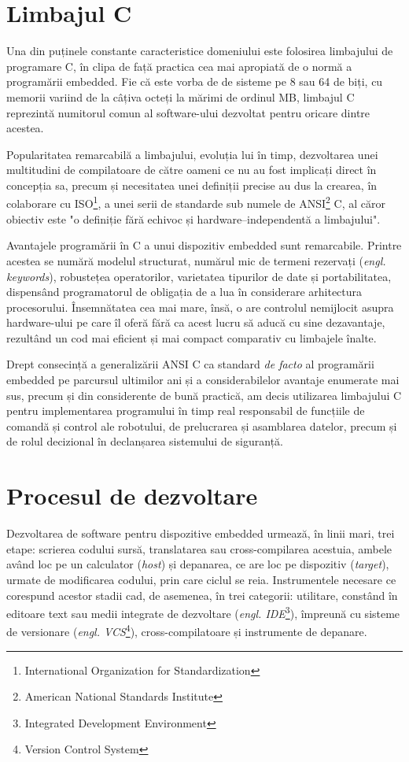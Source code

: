 \section{Limbajul C}

Una din puținele constante caracteristice domeniului este folosirea limbajului de programare C, în clipa de față practica cea mai apropiată de o normă a programării embedded. Fie că este vorba de de sisteme pe 8 sau 64 de biți, cu memorii variind de la câțiva octeți la mărimi de ordinul MB, limbajul C reprezintă numitorul comun al software-ului dezvoltat pentru oricare dintre acestea. \cite{barr}

Popularitatea remarcabilă a limbajului, evoluția lui în timp, dezvoltarea unei multitudini de compilatoare de către oameni ce nu au fost implicați direct în concepția sa, precum și necesitatea unei definiții precise au dus la crearea, în colaborare cu ISO\footnote{International Organization for Standardization}, a unei serii de standarde sub numele de ANSI\footnote{American National Standards Institute} C, al căror obiectiv este "o definiție fără echivoc și hardware--independentă a limbajului". \cite{ritchie}

Avantajele programării în C a unui dispozitiv embedded sunt remarcabile. Printre acestea se numără modelul structurat, numărul mic de termeni rezervați (\textit{engl. keywords}), robustețea operatorilor, varietatea tipurilor de date și portabilitatea, dispensând programatorul de obligația de a lua în considerare arhitectura procesorului. Însemnătatea cea mai mare, însă, o are controlul nemijlocit asupra hardware-ului pe care îl oferă fără ca acest lucru să aducă cu sine dezavantaje, rezultând un cod mai eficient și mai compact comparativ cu limbajele înalte.

Drept consecință a generalizării ANSI C ca standard \textit{de facto} al programării embedded pe parcursul ultimilor ani și a considerabilelor avantaje enumerate mai sus, precum și din considerente de bună practică, am decis utilizarea limbajului C pentru implementarea programului în timp real responsabil de funcțiile de comandă și control ale robotului, de prelucrarea și asamblarea datelor, precum și de rolul decizional în declanșarea sistemului de siguranță.


\section{Procesul de dezvoltare}

Dezvoltarea de software pentru dispozitive embedded urmează, în linii mari, trei etape: scrierea codului sursă, translatarea sau cross-compilarea acestuia, ambele având loc pe un calculator (\textit{host}) și depanarea, ce are loc pe dispozitiv (\textit{target}), urmate de modificarea codului, prin care ciclul se reia. Instrumentele necesare ce corespund acestor stadii cad, de asemenea, în trei categorii: utilitare, constând în editoare text sau medii integrate de dezvoltare (\textit{engl. IDE}\footnote{Integrated Development Environment}), împreună cu sisteme de versionare (\textit{engl. VCS}\footnote{Version Control System}), cross-compilatoare și instrumente de depanare. \cite{noergaard}

